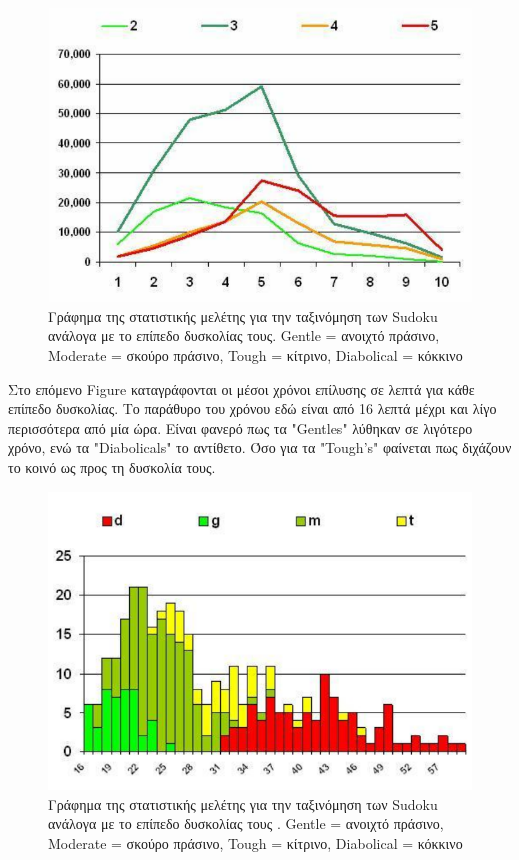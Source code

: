 \documentclass[oneside,12pt]{book}
\theoremstyle{definition}
\begin{document}
\begin{figure}[h]
	\centering
	\includegraphics[scale=0.45]{Figures/stat1.png}
	\caption{Γράφημα της στατιστικής μελέτης για την ταξινόμηση των Sudoku ανάλογα με το επίπεδο δυσκολίας τους. Gentle = ανοιχτό πράσινο, Moderate = σκούρο πράσινο, Tough = κίτρινο, Diabolical = κόκκινο}
\end{figure}

Στο επόμενο Figure καταγράφονται οι μέσοι χρόνοι επίλυσης σε λεπτά για κάθε επίπεδο δυσκολίας. Το παράθυρο του χρόνου εδώ είναι από 16 λεπτά μέχρι και λίγο περισσότερα από μία ώρα. Είναι φανερό πως τα "Gentles" λύθηκαν σε λιγότερο χρόνο, ενώ τα "Diabolicals" το αντίθετο. Όσο για τα "Tough's" φαίνεται πως διχάζουν το κοινό ως προς τη δυσκολία τους.

\begin{figure}[h]
	\centering
	\includegraphics[scale=0.55]{Figures/stat2.png}
	\caption{Γράφημα της στατιστικής μελέτης για την ταξινόμηση των Sudoku ανάλογα με το επίπεδο δυσκολίας τους . Gentle = ανοιχτό πράσινο, Moderate = σκούρο πράσινο, Tough = κίτρινο, Diabolical = κόκκινο}
\end{figure}
\end{document}
